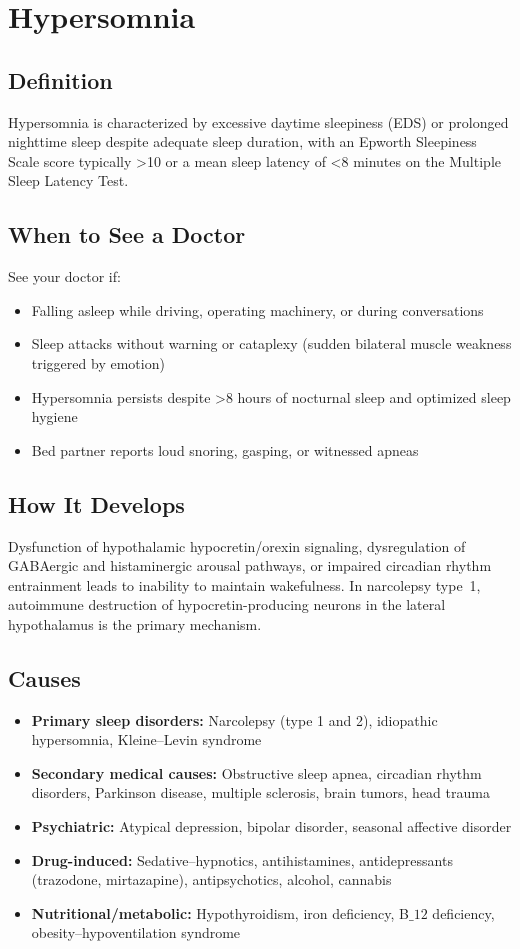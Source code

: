 \chapter{Hypersomnia}

\section*{Definition}
Hypersomnia is characterized by excessive daytime sleepiness (EDS) or prolonged nighttime sleep despite adequate sleep duration, with an Epworth Sleepiness Scale score typically \textgreater{}10 or a mean sleep latency of \textless{}8 minutes on the Multiple Sleep Latency Test.

\section*{When to See a Doctor}
See your doctor if:
\begin{itemize}
  \item Falling asleep while driving, operating machinery, or during conversations
  \item Sleep attacks without warning or cataplexy (sudden bilateral muscle weakness triggered by emotion)
  \item Hypersomnia persists despite \textgreater{}8 hours of nocturnal sleep and optimized sleep hygiene
  \item Bed partner reports loud snoring, gasping, or witnessed apneas
\end{itemize}

\section*{How It Develops}
Dysfunction of hypothalamic hypocretin/orexin signaling, dysregulation of GABAergic and histaminergic arousal pathways, or impaired circadian rhythm entrainment leads to inability to maintain wakefulness. In narcolepsy type~1, autoimmune destruction of hypocretin-producing neurons in the lateral hypothalamus is the primary mechanism.

\section*{Causes}
\begin{itemize}
  \item \textbf{Primary sleep disorders:} Narcolepsy (type 1 and 2), idiopathic hypersomnia, Kleine--Levin syndrome
  \item \textbf{Secondary medical causes:} Obstructive sleep apnea, circadian rhythm disorders, Parkinson disease, multiple sclerosis, brain tumors, head trauma
  \item \textbf{Psychiatric:} Atypical depression, bipolar disorder, seasonal affective disorder
  \item \textbf{Drug-induced:} Sedative--hypnotics, antihistamines, antidepressants (trazodone, mirtazapine), antipsychotics, alcohol, cannabis
  \item \textbf{Nutritional/metabolic:} Hypothyroidism, iron deficiency, B\(\_{12}\) deficiency, obesity--hypoventilation syndrome
\end{itemize}

